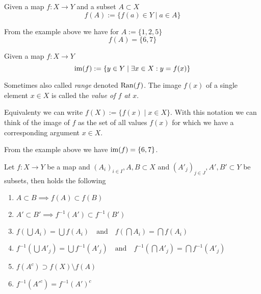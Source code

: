 \begin{definition}
   Given a map \(f: X \to Y\) and a subset \(A \subset X\)
   \[f(A) := \{f(a) \in Y \mid a \in A\}\]
\end{definition}
\begin{example}
   From the example above we have for \(A := \{1, 2, 5\}\)
   \[f(A) = \{6, 7\}\]
\end{example}

\begin{definition}
   Given a map \(f: X \to Y\)
   \[\operatorname{im}(f) := \{y \in Y \mid \exists x \in X: y = f(x)\}\]
\end{definition}
\begin{remark}[Terminology]
   Sometimes also called \emph{range} denoted \(\operatorname{Ran}(f)\).
   The image \(f(x)\) of a single element \(x \in X\) is called the \emph{value of \(f\) at \(x\)}.
\end{remark}
\begin{remark}[Intuition]
   Equivalenty we can write \(f(X) := \{f(x) \mid x \in X\}\).
   With this notation we can think of the image of \(f\) as the set of all values \(f(x)\) for which we have a corresponding argument \(x \in X\).
\end{remark}
\begin{example}
   From the example above we have \(\operatorname{im}(f) = \{6, 7\}\).
\end{example}

\begin{proposition}
   Let \(f: X \to Y\) be a map and \((A_i)_{i \in I}, A, B \subset X\) and \((A'_j)_{j \in J}, A', B' \subset Y\) be subsets, then holds the following
   \begin{enumerate}[label=\roman*, align=Center]
      \item \(A \subset B \implies f(A) \subset f(B)\)
      \item \(A' \subset B' \implies f^{-1}(A') \subset f^{-1}(B')\)
      \item \(f(\bigcup A_i) = \bigcup f(A_i) \quad\text{and}\quad f(\bigcap A_i) = \bigcap f(A_i)\)
      \item \(f^{-1}(\bigcup A'_j) = \bigcup f^{-1}(A'_j) \quad\text{and}\quad f^{-1}(\bigcap A'_j) = \bigcap f^{-1}(A'_j)\)
      \item \(f(A^c) \supset f(X) \setminus f(A)\)
      \item \(f^{-1}(A'^c) = f^{-1}(A')^c\)
   \end{enumerate}
\end{proposition}

